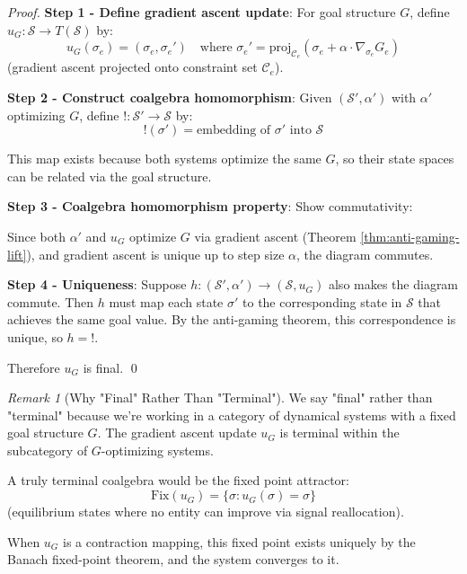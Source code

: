 \documentclass[11pt,a4paper]{article}
\theoremstyle{definition}
\theoremstyle{remark}
\newtheorem{remark}[theorem]{Remark}
\newcommand{\C}{\mathcal{C}}
\begin{document}
\begin{proof}
\textbf{Step 1 - Define gradient ascent update}: For goal structure $G$, define $u_G: \mathcal{S} \to T(\mathcal{S})$ by:
\[ u_G(\sigma_e) = (\sigma_e, \sigma_e') \quad \text{where } \sigma_e' = \text{proj}_{\C_e}\left(\sigma_e + \alpha \cdot \nabla_{\sigma_e} G_e\right) \]
(gradient ascent projected onto constraint set $\C_e$).

\textbf{Step 2 - Construct coalgebra homomorphism}: Given $(\mathcal{S}', \alpha')$ with $\alpha'$ optimizing $G$, define $!: \mathcal{S}' \to \mathcal{S}$ by:
\[ !(\sigma') = \text{embedding of } \sigma' \text{ into } \mathcal{S} \]

This map exists because both systems optimize the same $G$, so their state spaces can be related via the goal structure.

\textbf{Step 3 - Coalgebra homomorphism property}: Show commutativity:
\begin{center}
\end{center}

Since both $\alpha'$ and $u_G$ optimize $G$ via gradient ascent (Theorem \ref{thm:anti-gaming-lift}), and gradient ascent is unique up to step size $\alpha$, the diagram commutes.

\textbf{Step 4 - Uniqueness}: Suppose $h: (\mathcal{S}', \alpha') \to (\mathcal{S}, u_G)$ also makes the diagram commute. Then $h$ must map each state $\sigma'$ to the corresponding state in $\mathcal{S}$ that achieves the same goal value. By the anti-gaming theorem, this correspondence is unique, so $h = !$.

Therefore $u_G$ is final. \qed
\end{proof}

\begin{remark}[Why "Final" Rather Than "Terminal"]
We say "final" rather than "terminal" because we're working in a category of dynamical systems with a fixed goal structure $G$. The gradient ascent update $u_G$ is terminal within the subcategory of $G$-optimizing systems.

A truly terminal coalgebra would be the fixed point attractor:
\[ \text{Fix}(u_G) = \{\sigma : u_G(\sigma) = \sigma\} \]
(equilibrium states where no entity can improve via signal reallocation).

When $u_G$ is a contraction mapping, this fixed point exists uniquely by the Banach fixed-point theorem, and the system converges to it.
\end{remark}
\end{document}

